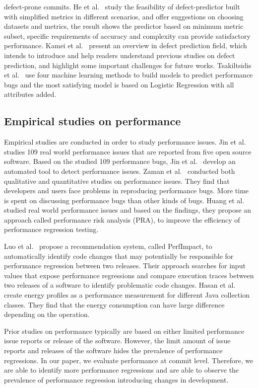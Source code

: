 defect-prone commits. He et al.~\cite{he2015empirical} study the feasibility of defect-predictor built with simplified metrics in different scenarios, and offer suggestions on choosing datasets and metrics, the result shows the predictor based on minimum metric subset, specific requirements of accuracy and complexity can provide satisfactory performance. Kamei et al.~\cite{kamei2016defect} present an overview in defect prediction field, which intends to introduce and help readers understand previous studies on defect prediction, and highlight some important challenges for future works. Tsakiltsidis et al.~\cite{tsakiltsidis2016automatic} use four machine learning methods to build models to predict performance bugs and the most satisfying model is based on Logistic Regression with all attributes added.

\subsection{Empirical studies on performance}
Empirical studies are conducted in order to study performance issues. Jin et al.~\cite{Jin:2012} studies 109 real world performance issues that are reported from five open source software. Based on the studied 109 performance bugs, Jin et al.~\cite{Jin:2012} develop an automated tool to detect performance issues. Zaman et al.~\cite{MSR11:Zaman,MSR12:Zaman} conducted both qualitative and quantitative studies on performance issues. They find that developers and users face problems in reproducing performance bugs. More time is spent on discussing performance bugs than other kinds of bugs. Huang et al.~\cite{ICSE2014:Huang} studied real world performance issues and based on the findings, they propose an approach called performance risk analysis (PRA), to improve the efficiency of performance regression testing. 

Luo et al.~\cite{ACM2016:Luo} propose a recommendation system, called PerfImpact, to automatically identify code changes that may potentially be responsible for performance regression between two releases. Their approach searches for input values that expose performance regressions and compare execution traces between two releases of a software to identify problematic code changes. Hasan et al.~\cite{Hasan:icse2016} create energy profiles as a performance measurement for different Java collection classes. They find that the energy consumption can have large difference depending on the operation.

Prior studies on performance typically are based on either limited performance issue reports or release of the software. However, the limit amount of issue reports and releases of the software hides the prevalence of performance regressions. In our paper, we evaluate performance at commit level. Therefore, we are able to identify more performance regressions and are able to observe the prevalence of performance regression introducing changes in development. 
